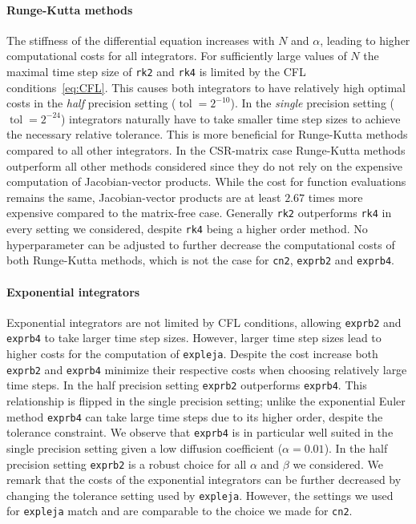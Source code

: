 \documentclass{scrartcl}
\begin{document}
	\paragraph{Runge-Kutta methods}
	The stiffness of the differential equation increases with $N$ and $\alpha$, leading to higher computational costs for all integrators. For sufficiently large values of $N$ the maximal time step size of \texttt{rk2} and \texttt{rk4} is limited by the CFL conditions~\eqref{eq:CFL}. This causes both integrators to have relatively high optimal costs in the \textit{half} precision setting ($\operatorname{tol}=2^{-10}$). In the \textit{single} precision setting ($\operatorname{tol}=2^{-24}$) integrators naturally have to take smaller time step sizes to achieve the necessary relative tolerance. This is more beneficial for Runge-Kutta methods compared to all other integrators. In the CSR-matrix case Runge-Kutta methods outperform all other methods considered since they do not rely on the expensive computation of Jacobian-vector products. While the cost for function evaluations remains the same, Jacobian-vector products are at least $2.67$ times more expensive compared to the matrix-free case. Generally \texttt{rk2} outperforms \texttt{rk4} in every setting we considered, despite \texttt{rk4} being a higher order method. No hyperparameter can be adjusted to further decrease the computational costs of both Runge-Kutta methods, which is not the case for \texttt{cn2}, \texttt{exprb2} and \texttt{exprb4}.
	
	\paragraph{Exponential integrators}
	Exponential integrators are not limited by CFL conditions, allowing \texttt{exprb2} and \texttt{exprb4} to take larger time step sizes. However, larger time step sizes lead to higher costs for the computation of \texttt{expleja}. Despite the cost increase both \texttt{exprb2} and \texttt{exprb4} minimize their respective costs when choosing relatively large time steps. In the half precision setting \texttt{exprb2} outperforms \texttt{exprb4}. This relationship is flipped in the single precision setting; unlike the exponential Euler method \texttt{exprb4} can take large time steps due to its higher order, despite the tolerance constraint. We observe that \texttt{exprb4} is in particular well suited in the single precision setting given a low diffusion coefficient ($\alpha = 0.01$). In the half precision setting \texttt{exprb2} is a robust choice for all $\alpha$ and $\beta$ we considered. We remark that the costs of the exponential integrators can be further decreased by changing the tolerance setting used by \texttt{expleja}. However, the settings we used for \texttt{expleja} match \cite{lejarev} and are comparable to the choice we made for \texttt{cn2}. 
	
\end{document}

